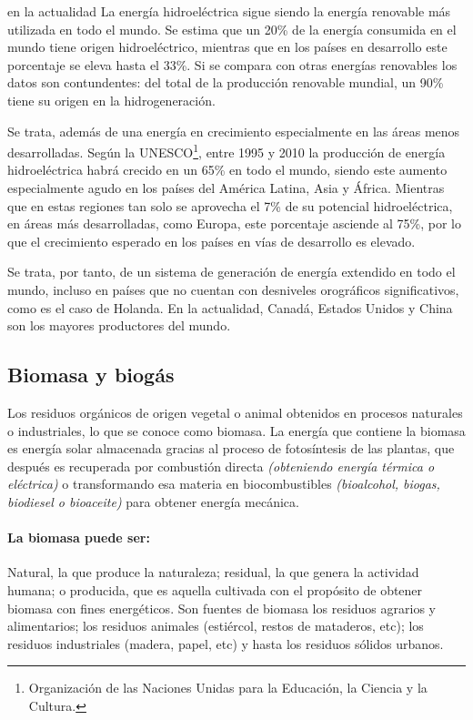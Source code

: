 \documentclass[12pt,letterpaper,superscriptaddress]{article}
\begin{document}
en la actualidad La energía hidroeléctrica sigue siendo la energía renovable más utilizada en todo el mundo. Se estima que un 20\% de la energía consumida en el mundo tiene origen hidroeléctrico, mientras que en los países en desarrollo este porcentaje se eleva hasta el 33\%. Si se compara con otras energías renovables los datos son contundentes: del total de la producción renovable mundial, un 90\% tiene su origen en la hidrogeneración.

Se trata, además de una energía en crecimiento especialmente en las áreas menos desarrolladas. Según la UNESCO\footnote{Organización de las Naciones Unidas para la Educación, la Ciencia y la Cultura.}, entre 1995 y 2010 la producción de energía hidroeléctrica habrá crecido en un 65\% en todo el mundo, siendo este aumento especialmente agudo en los países del América Latina, Asia y África. Mientras que en estas regiones tan solo se aprovecha el 7\% de su potencial hidroeléctrica, en áreas más desarrolladas, como Europa, este porcentaje asciende al 75\%, por lo que el crecimiento esperado en los países en vías de desarrollo es elevado.

Se trata, por tanto, de un sistema de generación de energía extendido en todo el mundo, incluso en países que no cuentan con desniveles orográficos significativos, como es el caso de Holanda. En la actualidad, Canadá, Estados Unidos y China son los mayores productores del mundo.

\clearpage

\subsection{Biomasa y biogás}

Los  residuos orgánicos de origen vegetal o animal obtenidos en procesos naturales o industriales, lo que se conoce como biomasa. La energía que contiene la biomasa es energía solar almacenada gracias al proceso de fotosíntesis de las plantas, que después es recuperada por combustión directa \emph{(obteniendo energía térmica o eléctrica)} o transformando esa materia en biocombustibles \emph{(bioalcohol, biogas, biodiesel o bioaceite)} para obtener energía mecánica.

\paragraph{La biomasa puede ser:}
Natural, la que produce la naturaleza; residual, la que genera la actividad humana; o producida, que es aquella cultivada con el propósito de obtener biomasa con fines energéticos.  Son fuentes de biomasa los residuos agrarios y alimentarios; los residuos animales (estiércol, restos de mataderos, etc); los residuos industriales (madera, papel, etc) y hasta los residuos sólidos urbanos.
\end{document}
